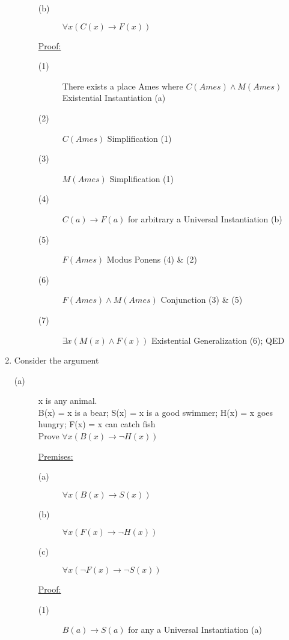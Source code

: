 \documentclass[12pt]{article}
\begin{document}
\begin{enumerate}
\begin{description}
\begin{description}
                        \item[(b)] $\forall x(C(x) \to F(x))$
                    \end{description}
                    \underline{Proof:}
                    \begin{description}
                        \item[(1)] There exists a place Ames where $C(Ames) \land M(Ames)$ \null\hfill Existential Instantiation (a)
                        \item[(2)] $C(Ames)$ \null\hfill Simplification (1)
                        \item[(3)] $M(Ames)$ \null\hfill Simplification (1)
                        \item[(4)] $C(a) \to F(a)$ for arbitrary a \null\hfill Universal Instantiation (b)
                        \item[(5)] $F(Ames)$ \null\hfill Modus Ponens (4) \& (2)
                        \item[(6)] $F(Ames) \land M(Ames)$ \null\hfill Conjunction (3) \& (5)
                        \item[(7)] $\exists x(M(x) \land F(x))$ \null\hfill Existential Generalization (6); QED
                    \end{description}
            \end{description}
        \newpage
        \item Consider the argument
            \begin{description}
                \item[(a)] \begin{center}x is any animal.\\B(x) = x is a bear; S(x) = x is a good swimmer; H(x) = x goes hungry; F(x) = x can catch fish\\ Prove $\forall x(B(x) \to \neg H(x))$ \end{center}
                \underline{Premises:}
                \begin{description}
                    \item[(a)] $\forall x(B(x) \to S(x))$
                    \item[(b)] $\forall x(F(x) \to \neg H(x))$
                    \item[(c)] $\forall x(\neg F(x) \to \neg S(x))$
                \end{description}
                \underline{Proof:}
                \begin{description}
                    \item[(1)] $B(a) \to S(a)$ for any a \null\hfill Universal Instantiation (a)

\end{description}
\end{description}
\end{enumerate}
\end{document}
